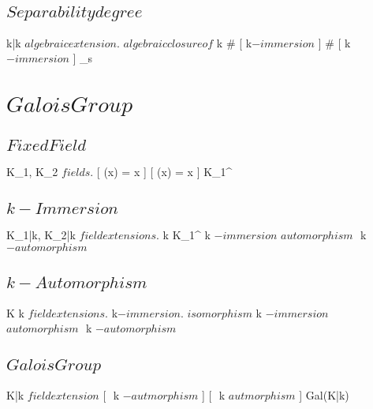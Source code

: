 \documentclass[a5paper]{book}
\begin{document}
{	

	\subsection{ $ Separability degree $ }
	
	{
		k|k $ algebraic extension $.
		 $ algebraic closure of $ k
	}
	{
		\# [ \sigma \; k$-immersion$ ]
	}
	\denote
	{
		\# [ \sigma \; k$-immersion$ ] \as [K:k]_s
	}
}


\section{ $ Galois Group $ }
{
	


	\subsection{ $ Fixed Field $ }

	{
		K_1, K_2 $ fields $.
	}
	{
		[ \sigma(x) = x ]
	}
	\denote
	{
		[ \sigma(x) = x ] \as K_1^\sigma
	}

	\newpage


	\subsection{ $ k-Immersion $ }

	{
		K_1|k, K_2|k $ field extensions $.
	}
	{
		k \subset K_1^\sigma
	}
	\denote
	{
		\sigma \; k $-immersion $ \logicand \sigma $ automorphism $ \as \sigma $ $ k $-automorphism $
	}


	\subsection{ $ k-Automorphism $ }

	{
		K \extends k $ field extensions $.
	}
	{
		\sigma \; k$-immersion$.
		\sigma $ isomorphism $
	}
	\denote
	{
		\sigma \; k $-immersion $ \logicand \sigma $ automorphism $ \as \sigma $ $ k $-automorphism $
	}

	\subsection{ $ Galois Group $ }

	{
		K|k $ field extension $
	}
	{
		[ \sigma $ $ k $-autmorphism $ ]
	}
	\denote
	{
		[ \sigma $ $ k $ autmorphism $ ] \as Gal(K|k)
	}

	\newpage

}
\end{document}
